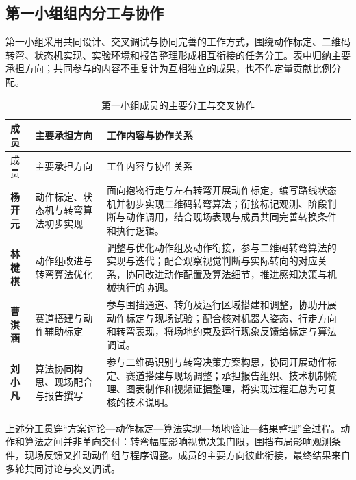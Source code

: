 \subsection{第一小组组内分工与协作}
第一小组采用共同设计、交叉调试与协同完善的工作方式，围绕动作标定、二维码转弯、状态机实现、实验环境和报告整理形成相互衔接的任务分工。表中归纳主要承担方向；共同参与的内容不重复计为互相独立的成果，也不作定量贡献比例分配。
\begin{longtable}{p{18mm}p{37mm}p{88mm}}
\caption{第一小组成员的主要分工与交叉协作}\\\toprule
成员 & 主要承担方向 & 工作内容与协作关系\\\midrule\endfirsthead
\toprule 成员 & 主要承担方向 & 工作内容与协作关系\\\midrule\endhead
\textbf{杨开元} & 动作标定、状态机与转弯算法初步实现 & 面向抱物行走与左右转弯开展动作标定，编写路线状态机并初步实现二维码转弯算法；衔接标记观测、阶段判断与动作调用，结合现场表现与成员共同完善转换条件和执行逻辑。\\
\textbf{林楗棋} & 动作组改进与转弯算法优化 & 调整与优化动作组及动作衔接，参与二维码转弯算法的实现与迭代；配合观察视觉判断与实际转向的对应关系，协同改进动作配置及算法细节，推进感知决策与机械执行的协调。\\
\textbf{曹淇涵} & 赛道搭建与动作辅助标定 & 参与围挡通道、转角及运行区域搭建和调整，协助开展动作标定与现场试验；配合核对机器人姿态、行走方向和转弯表现，将场地约束及运行现象反馈给标定与算法调试。\\
\textbf{刘小凡} & 算法协同构思、现场配合与报告撰写 & 参与二维码识别与转弯决策方案构思，协同开展动作标定、赛道搭建与现场调整；承担报告组织、技术机制梳理、图表制作和视频证据整理，将实现过程汇总为可复核的技术说明。\\\bottomrule
\end{longtable}
上述分工贯穿“方案讨论—动作标定—算法实现—场地验证—结果整理”全过程。动作和算法之间并非单向交付：转弯幅度影响视觉决策门限，围挡布局影响观测条件，现场反馈又推动动作组与程序调整。成员的主要方向彼此衔接，最终结果来自多轮共同讨论与交叉调试。
